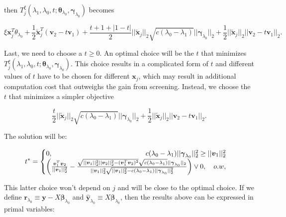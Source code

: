 then $T^\xi_j(\lambda_1,\lambda_0,t;\boldsymbol\theta_{\lambda_0},\boldsymbol\gamma_{\lambda_0})$ becomes

\begin{equation}
    \label{eq:txi}
    \xi\boldsymbol x_j^T\theta_{\lambda_0}+\frac{1}{2} \tilde{\boldsymbol x}_j^T(\boldsymbol v_2-t \boldsymbol v_1)+\frac{t+1+|1-t|}{2}||\tilde{\boldsymbol x}_j||_2\sqrt{c(\lambda_0-\lambda_1)}||\boldsymbol\gamma_{\lambda_0}||_2+\frac{1}{2}||\tilde{\boldsymbol x}_j||_2||\boldsymbol v_2-t\boldsymbol v_1||_2.
\end{equation}

Last, we need to choose a $t\geq 0$. An optimal choice will be the $t$ that minimizes $T^\xi_j(\lambda_1,\lambda_0,t;\boldsymbol\theta_{\lambda_0},\boldsymbol\gamma_{\lambda_0})$. This choice results in a complicated form of $t$ and different values of $t$ have to be chosen for different $\boldsymbol x_j$, which may result in additional computation cost that outweighs the gain from screening. Instead, we choose the $t$ that minimizes a simpler objective

\begin{equation}
    \frac{t}{2}||\tilde{\boldsymbol x}_j||_2\sqrt{c(\lambda_0-\lambda_1)}||\boldsymbol\gamma_{\lambda_0}||_2+\frac{1}{2}||\tilde{\boldsymbol x}_j||_2||\boldsymbol v_2-t\boldsymbol v_1||_2.
\end{equation}

The solution will be:

\begin{equation}
    t^*=\begin{cases}
            0,\hfill c(\lambda_0-\lambda_1)||\boldsymbol\gamma_{\lambda_0}||_2^2\geq ||\boldsymbol v_1||^2_2\\
            \left(\frac{\boldsymbol v_1^T\boldsymbol v_2}{||\boldsymbol v_1||_2^2}-\frac{\sqrt{||\boldsymbol v_1||_2^2||\boldsymbol v_2||_2^2-(\boldsymbol v_1^T\boldsymbol v_2)^2}\sqrt{c(\lambda_0-\lambda_1)}||\boldsymbol\gamma_{\lambda_0}||_2}{||\boldsymbol v_1||_2^2\sqrt{||\boldsymbol v_1||_2^2-c(\lambda_0-\lambda_1)||\boldsymbol\gamma_{\lambda_0}||_2^2}}\right)\vee 0,\hfill\quad o.w,
            \end{cases}
\end{equation}

This latter choice won't depend on $j$ and will be close to the optimal choice. If we define $\boldsymbol r_{\lambda_0}\equiv \boldsymbol y-X\boldsymbol\beta_{\lambda_0}$ and $\hat{\boldsymbol y}_{\lambda_0}\equiv X\boldsymbol\beta_{\lambda_0}$, then the results above can be expressed in primal variables:

